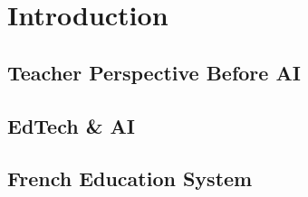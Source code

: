 \chapter{Introduction}

\lipsum[1-3]

\section{Teacher Perspective Before AI}

\lipsum[1-3]

\section{EdTech \& AI}

\lipsum[1-3]

\section{French Education System}

\lipsum[1-3]